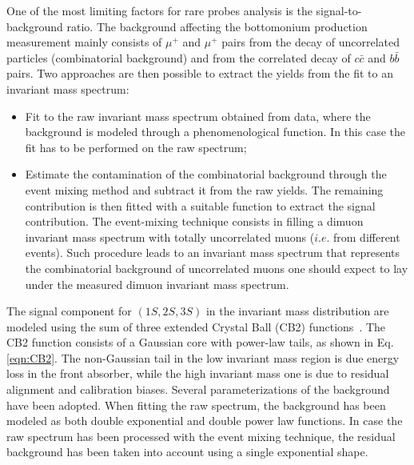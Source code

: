 One of the most limiting factors for rare probes analysis is the signal-to-background ratio.
The background affecting the bottomonium production measurement mainly consists of $\mu^+$ and $\mu^+$ pairs from the decay of uncorrelated particles (combinatorial background) and from the correlated decay of $c\bar{c}$ and $b\bar{b}$ pairs.
Two approaches are then possible to extract the yields from the fit to an invariant mass spectrum:
\begin{itemize}
\item Fit to the raw invariant mass spectrum obtained from data, where the background is modeled through a phenomenological function. In this case the fit has to be performed on the raw spectrum;
\item Estimate the contamination of the combinatorial background through the event mixing method and subtract it from the raw yields. The remaining contribution is then fitted with a suitable function to extract the signal contribution. The event-mixing technique consists in filling a dimuon invariant mass spectrum with totally uncorrelated muons ($i.e.$ from different events). Such procedure leads to an invariant mass spectrum that represents the combinatorial background of uncorrelated muons one should expect to lay under the measured dimuon invariant mass spectrum.
\end{itemize}

The signal component for \upsi$(1S,2S,3S)$ in the invariant mass distribution are modeled using the sum of three extended Crystal Ball (CB2) functions~\cite{ALICE-Quarkonia-signal-extraction}. 
The CB2 function consists of a Gaussian core with  power-law tails, as shown in Eq. \ref{eqn:CB2}.
The non-Gaussian tail in the low invariant mass region is due energy loss in the front absorber, while the high invariant mass one is due to residual alignment and calibration biases.
Several parameterizations of the background have been adopted.
When fitting the raw spectrum, the background has been modeled as both double exponential and double power law functions.
In case the raw spectrum has been processed with the event mixing technique, the residual background has been taken into account using a single exponential shape.

